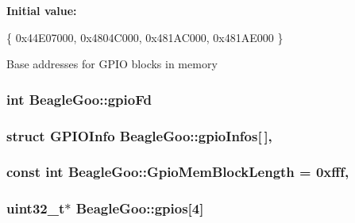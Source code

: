 {\bfseries Initial value\-:}
\begin{DoxyCode}

        \{ 0x44E07000, 0x4804C000, 0x481AC000, 0x481AE000 \}
\end{DoxyCode}
Base addresses for G\-P\-I\-O blocks in memory \hypertarget{struct_beagle_goo_a1d4a232a0dbb10d38249e239c7e04788}{
\subsubsection[{gpio\-Fd}]{\setlength{\rightskip}{0pt plus 5cm}int Beagle\-Goo\-::gpio\-Fd\hspace{0.3cm}{\ttfamily [protected]}}}\label{struct_beagle_goo_a1d4a232a0dbb10d38249e239c7e04788}
\hypertarget{struct_beagle_goo_a2856c2fe9e24825ffd5691ab9a53d1f8}{
\subsubsection[{gpio\-Infos}]{\setlength{\rightskip}{0pt plus 5cm}struct {\bf G\-P\-I\-O\-Info} Beagle\-Goo\-::gpio\-Infos\mbox{[}$\,$\mbox{]}\hspace{0.3cm}{\ttfamily [static]}, {\ttfamily [protected]}}}\label{struct_beagle_goo_a2856c2fe9e24825ffd5691ab9a53d1f8}
\hypertarget{struct_beagle_goo_a0d7150aa275f183b3c552ab89584f272}{
\subsubsection[{Gpio\-Mem\-Block\-Length}]{\setlength{\rightskip}{0pt plus 5cm}const int Beagle\-Goo\-::\-Gpio\-Mem\-Block\-Length = 0xfff\hspace{0.3cm}{\ttfamily [static]}, {\ttfamily [protected]}}}\label{struct_beagle_goo_a0d7150aa275f183b3c552ab89584f272}
\hypertarget{struct_beagle_goo_aaa05aec2adfcadae3912e861ae35d50b}{
\subsubsection[{gpios}]{\setlength{\rightskip}{0pt plus 5cm}uint32\-\_\-t$\ast$ Beagle\-Goo\-::gpios\mbox{[}4\mbox{]}\hspace{0.3cm}{\ttfamily [protected]}}}\label{struct_beagle_goo_aaa05aec2adfcadae3912e861ae35d50b}
